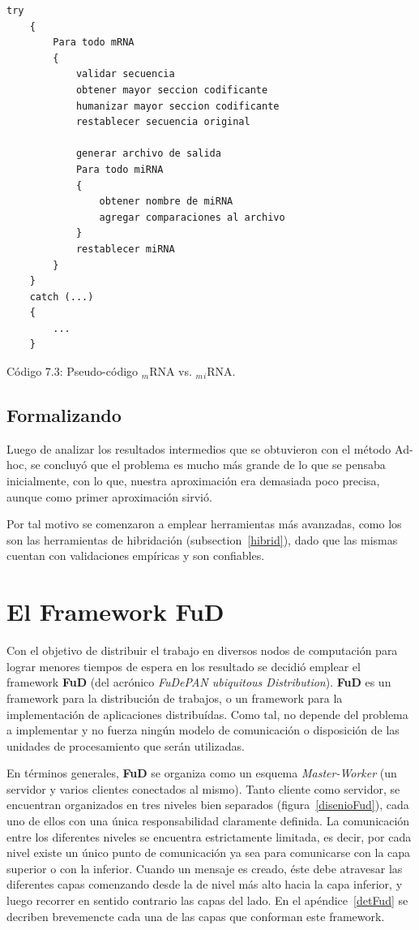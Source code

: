 \begin{minipage}{\linewidth}
	\begin{lstlisting}[basicstyle=\tt, frame=trBL, tabsize=4,fontadjust=true]
	try
	{
		Para todo mRNA
		{
			validar secuencia
			obtener mayor seccion codificante
			humanizar mayor seccion codificante
			restablecer secuencia original

			generar archivo de salida
			Para todo miRNA
			{
				obtener nombre de miRNA
				agregar comparaciones al archivo
			}
			restablecer miRNA
		}
	}
	catch (...)
	{
		...
	}
	\end{lstlisting}
\end{minipage}
\hspace*{3cm}\caption{Código 7.3: Pseudo-código $_m$RNA vs. $_m$$_i$RNA.}

\subsection{Formalizando}
\par Luego de analizar los resultados intermedios que se obtuvieron con el método Ad-hoc, se concluyó que el problema es mucho más grande de lo que se pensaba inicialmente, con lo que, nuestra aproximación era demasiada poco precisa, aunque como primer aproximación sirvió. 
\par Por tal motivo se comenzaron a emplear herramientas más avanzadas, como los son las herramientas de hibridación (subsection~\ref{hibrid}), dado que las mismas cuentan con validaciones empíricas y son confiables.

\section{El Framework FuD}
\par Con el objetivo de distribuir el trabajo en diversos nodos de computación para lograr menores tiempos de espera en los resultado se decidió emplear el framework \textbf{FuD} (del acrónico \emph{FuDePAN ubiquitous Distribution}). \textbf{FuD} es un framework para la distribución de trabajos, o un framework para la implementación de aplicaciones distribuídas\cite{clus09}. Como tal, no depende del problema a implementar y no fuerza ningún modelo de comunicación o disposición de las unidades de procesamiento que serán utilizadas. 
\par En términos generales, \textbf{FuD} se organiza como un esquema \emph{Master-Worker} (un servidor y varios clientes conectados al mismo). Tanto cliente como servidor, se encuentran organizados en tres niveles bien separados (figura~\ref{disenioFud}), cada uno de ellos con una única responsabilidad claramente definida. La comunicación entre los diferentes niveles se encuentra estrictamente limitada, es decir, por cada nivel existe un único punto de comunicación ya sea para comunicarse con la capa superior o con la inferior. Cuando un mensaje es creado, éste debe atravesar las diferentes capas comenzando desde la de nivel más alto hacia la capa inferior, y luego recorrer en sentido contrario las capas del lado. En el apéndice~\ref{detFud} se decriben brevemencte cada una de las capas que conforman este framework.

